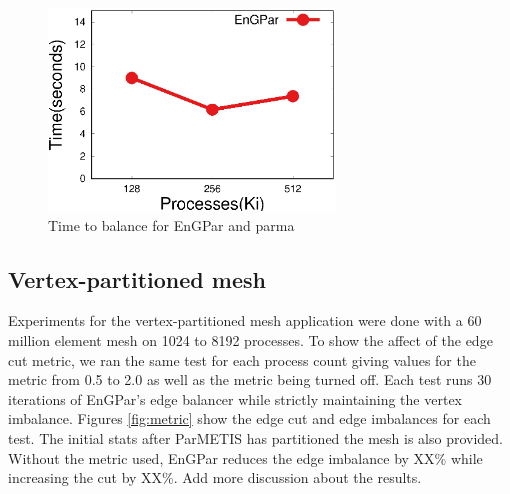 \documentclass[conference]{IEEEtran}
\begin{document}
\begin{figure}[!ht]
  \centering
  \includegraphics[width=3in]{plots/mira_fem_results/time_v_cores}
  \caption{Time to balance for EnGPar and parma}
  \label{fig:fem_time}
\end{figure}

\subsection {Vertex-partitioned mesh}
Experiments for the vertex-partitioned mesh application were done with a 60 million
element mesh on 1024 to 8192 processes. To show the affect of the edge cut
metric, we ran the same test for each process count giving values for the metric
from 0.5 to 2.0 as well as the metric being turned off. Each test runs 30 iterations
of EnGPar's edge balancer while strictly maintaining the vertex imbalance. Figures
\ref{fig:metric} show the edge cut and edge imbalances for each
test. The initial stats after ParMETIS has partitioned the mesh is also provided. Without
the metric used, EnGPar reduces the edge imbalance by XX\% while increasing the cut by
XX\%. {\color{red} Add more discussion about the results.}
\end{document}
